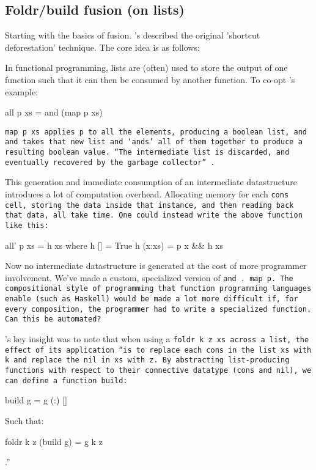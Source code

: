 \subsection{Foldr/build fusion (on lists)}\label{sec:foldr/build}
Starting with the basics of fusion.
\cite{Gill1993}'s described the original 'shortcut deforestation' technique.
The core idea is as follows:

In functional programming, lists are (often) used to store the output of one function such that it can then be consumed by another function. To co-opt \cite{Gill1993}'s example:
\begin{code}
    all p xs = and (map p xs)
\end{code}

\tt{map p xs} applies \tt{p} to all the elements, producing a boolean list, and \tt{and} takes that new list and `ands' all of them together to produce a resulting boolean value. ``The intermediate list is discarded, and eventually recovered by the garbage collector'' \citep{Gill1993}.

This generation and immediate consumption of an intermediate datastructure introduces a lot of computation overhead. Allocating memory for each \tt{cons} cell, storing the data inside that instance, and then reading back that data, all take time. One could instead write the above function like this:
\begin{code}
    all' p xs = h xs
       where h []     = True
             h (x:xs) = p x && h xs
\end{code}
Now no intermediate datastructure is generated at the cost of more programmer involvement. We've made a custom, specialized version of \tt{and~.~map~p}. The compositional style of programming that function programming languages enable (such as Haskell) would be made a lot more difficult if, for every composition, the programmer had to write a specialized function. Can this be automated?

\cite{Gill1993}'s key insight was to note that when using a \tt{foldr k z xs} across a list, the effect of its application ``is to replace each \tt{cons} in the list \tt{xs} with k and replace the \tt{nil} in \tt{xs} with \tt{z}. By abstracting list-producing functions with respect to their connective datatype (\tt{cons} and \tt{nil}), we can define a function \tt{build}:
\begin{code}
    build g = g (:) []
\end{code}
Such that:
\begin{code}
    foldr k z (build g) = g k z
\end{code}
\cite{Gill1993}.''


